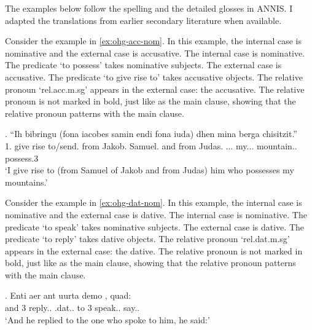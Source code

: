 The examples below follow the spelling and the detailed glosses in ANNIS. I adapted the translations from earlier secondary literature when available.

Consider the example in \ref{ex:ohg-acc-nom}. In this example, the internal case is nominative and the external case is accusative.
The internal case is nominative. The predicate  `to possess' takes nominative subjects.
The external case is accusative. The predicate  `to give rise to' takes accusative objects.
The relative pronoun  `\ac{rel}.\ac{acc}.\ac{m}.\ac{sg}' appears in the external case: the accusative. The relative pronoun is not marked in bold, just like as the main clause, showing that the relative pronoun patterns with the main clause.


\exg. ``Ih bibringu (fona iacobes samin endi fona iuda) dhen mina berga chisitzit.''\\
1. {give rise to/send}. from Jakob. Samuel. and from Judas. ... my... mountain.. possess.3\\
`I give rise to (from Samuel of Jakob and from Judas) him who possesses my mountains.' \label{ex:ohg-acc-nom}

Consider the example in \ref{ex:ohg-dat-nom}. In this example, the internal case is nominative and the external case is dative.
The internal case is nominative. The predicate  `to speak' takes nominative subjects.
The external case is dative. The predicate  `to reply' takes dative objects.
The relative pronoun  `\ac{rel}.\ac{dat}.\ac{m}.\ac{sg}' appears in the external case: the dative. The relative pronoun is not marked in bold, just like as the main clause, showing that the relative pronoun patterns with the main clause.

\exg. Enti aer {ant uurta} demo  , quad:\\
and 3 reply..\scsub{[dat]} .\ac{dat}.. {to 3} speak..\scsub{[nom]} say..\\
`And he replied to the one who spoke to him, he said:' \label{ex:ohg-dat-nom}

